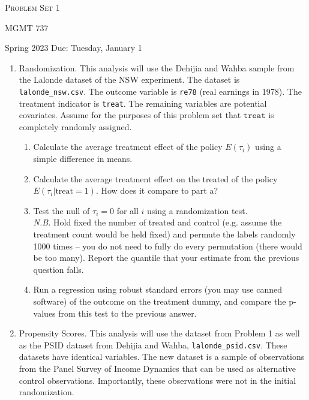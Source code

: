 \documentclass[11pt, a4paper]{article}
\begin{document}
\begin{center}
  {\Large \textsc{Problem Set 1}}

  MGMT 737
\end{center}
\begin{center}
  Spring 2023
  Due: Tuesday, January 1
\end{center}

\begin{enumerate}
\item Randomization. This analysis will use the Dehijia
  and Wahba sample from the Lalonde dataset of the NSW experiment. The dataset is
  \texttt{lalonde\_nsw.csv}. The outcome variable is \texttt{re78}
  (real earnings in 1978). The treatment indicator is
  \texttt{treat}. The remaining variables are potential covariates. Assume for the purposes of this problem set that $\texttt{treat}$ is completely randomly assigned. 
  \begin{enumerate}
  \item Calculate the average treatment effect of the policy
    $E(\tau_{i})$ using a simple difference in means.
  \item Calculate the average treatment effect on the treated of the policy
    $E(\tau_{i}| \mathrm{treat} = 1)$. How does it compare to part a? 
  \item Test the null of $\tau_{i} = 0$ for all $i$ using a
    randomization test. \\
    \emph{N.B.} Hold fixed the number of treated and control
    (e.g. assume the treatment count would be held fixed) and permute
    the labels randomly 1000 times -- you do not need to fully do
    every permutation (there would be too many). Report the quantile
    that your estimate from the previous question falls.
  \item Run a regression using robust standard errors (you may use
    canned software) of the outcome on the treatment dummy, and
    compare the p-values from this test to the previous answer.
  \end{enumerate}
\item Propensity Scores. This analysis will use the dataset
  from Problem 1 as well as the PSID dataset from Dehijia and
  Wahba, \texttt{lalonde\_psid.csv}. These datasets have identical
  variables. The new dataset is a sample of observations from the
  Panel Survey of Income Dynamics that can be used as alternative
  control observations. Importantly, these observations were not in
  the initial randomization.
  \begin{enumerate}

\end{enumerate}
\end{enumerate}
\end{document}

